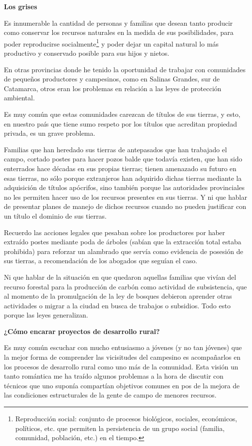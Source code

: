 \begin{fullwidth}
\textbf{Los grises}

\protect\hypertarget{_gjdgxs}{}{}Es innumerable la cantidad de personas
y familias que desean tanto producir como conservar los recursos
naturales en la medida de sus posibilidades, para poder reproducirse
socialmente\footnote{Reproducción social: conjunto de procesos
  biológicos, sociales, económicos, políticos, etc. que permiten la
  persistencia de un grupo social (familia, comunidad, población, etc.)
  en el tiempo.} y poder dejar un capital natural lo más productivo y
conservado posible para sus hijos y nietos.

En otras provincias donde he tenido la oportunidad de trabajar con
comunidades de pequeños productores y campesinos, como en Salinas
Grandes, sur de Catamarca, otros eran los problemas en relación a las
leyes de protección ambiental.

Es muy común que estas comunidades carezcan de títulos de sus tierras, y
esto, en nuestro país que tiene sumo respeto por los títulos que
acreditan propiedad privada, es un grave problema.

Familias que han heredado sus tierras de antepasados que han trabajado
el campo, cortado postes para hacer pozos balde que todavía existen, que
han sido enterrados hace décadas en sus propias tierras; tienen
amenazado su futuro en esas tierras, no sólo porque extranjeros han
adquirido dichas tierras mediante la adquisición de títulos apócrifos,
sino también porque las autoridades provinciales no les permiten hacer
uso de los recursos presentes en sus tierras. Y ni que hablar de
presentar planes de manejo de dichos recursos cuando no pueden
justificar con un título el dominio de sus tierras.

Recuerdo las acciones legales que pesaban sobre los productores por
haber extraído postes mediante poda de árboles (sabían que la extracción
total estaba prohibida) para reforzar un alambrado que servía como
evidencia de posesión de sus tierras, a recomendación de los abogados
que seguían el caso.

Ni que hablar de la situación en que quedaron aquellas familias que
vivían del recurso forestal para la producción de carbón como actividad
de subsistencia, que al momento de la promulgación de la ley de bosques
debieron aprender otras actividades o migrar a la ciudad en busca de
trabajos o subsidios. Todo esto porque las leyes generalizan.

\textbf{¿Cómo encarar proyectos de desarrollo rural? }

Es muy común escuchar con mucho entusiasmo a jóvenes (y no tan jóvenes)
que la mejor forma de comprender las vicisitudes del campesino es
acompañarlos en los procesos de desarrollo rural como uno más de la
comunidad. Esta visión un tanto romántica me ha traído algunos problemas
a la hora de discutir con técnicos que uno suponía compartían objetivos
comunes en pos de la mejora de las condiciones estructurales de la gente
de campo de menores recursos.


\end{fullwidth}
